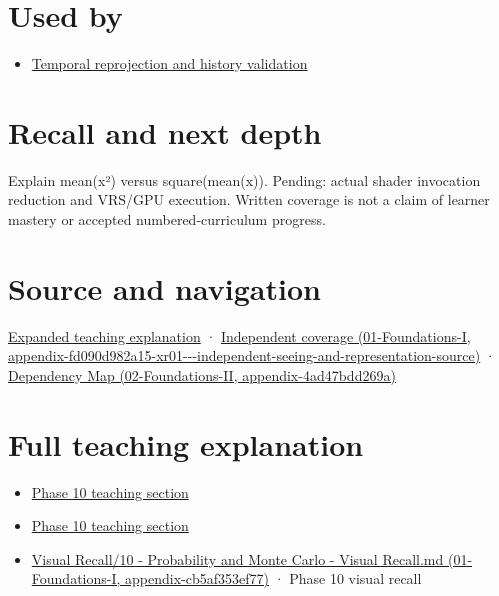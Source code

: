 \section{Used by}\label{appendix-4192b2bdd21e-used-by}

\begin{itemize}
\tightlist
\item
  \hyperref[appendix-0727340a4428]{Temporal reprojection and history validation}
\end{itemize}

\section{Recall and next depth}\label{appendix-4192b2bdd21e-recall-and-next-depth}

Explain mean(x²) versus square(mean(x)). Pending: actual shader invocation reduction and VRS/GPU execution. Written coverage is not a claim of learner mastery or accepted numbered-curriculum progress.

\section{Source and navigation}\label{appendix-4192b2bdd21e-source-and-navigation}

\href{Continuous\%20Notes/University\%20-\%20Worlds,\%20Images\%20and\%20Inference\%20-\%20Graphics,\%20Vision\%20and\%20Photography\#Multiresolution\%20work\%20must\%20preserve\%20the\%20right\%20information}{Expanded teaching explanation} · \href{../01-Foundations-I/main.pdf\#nameddest=appendix-fd090d982a15-xr01---independent-seeing-and-representation-source}{Independent coverage (01-Foundations-I, appendix-fd090d982a15-xr01-\/-\/-independent-seeing-and-representation-source)} · \href{../02-Foundations-II/main.pdf\#nameddest=appendix-4ad47bdd269a}{Dependency Map (02-Foundations-II, appendix-4ad47bdd269a)}

\section{Full teaching explanation}\label{appendix-4192b2bdd21e-full-teaching-explanation}

\begin{itemize}
\tightlist
\item
  \href{Continuous\%20Notes/Computing\%20Foundations\%20-\%20From\%20Bits\%20to\%20C++\%20and\%20Systems\%20APIs\#6.\%20A\%20computer\%20produces\%20deterministic\%20pseudorandom\%20sequences}{Phase 10 teaching section}
\item
  \href{Continuous\%20Notes/Computing\%20Foundations\%20-\%20From\%20Bits\%20to\%20C++\%20and\%20Systems\%20APIs\#12.\%20Use\%20probability\%20to\%20evaluate\%20graphics\%20and\%20research\%20claims}{Phase 10 teaching section}
\item
  \href{../01-Foundations-I/main.pdf\#nameddest=appendix-cb5af353ef77}{Visual Recall/10 - Probability and Monte Carlo - Visual Recall.md (01-Foundations-I, appendix-cb5af353ef77)} · Phase 10 visual recall
\end{itemize}
